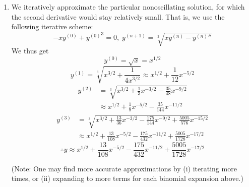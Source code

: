 \begin{enumerate}[wide, labelindent=0pt, label= (\alph*)]
\item
We iteratively approximate the particular nonoscillating solution, for which the second derivative would stay relatively small.
That is, we use the following iterative scheme:
\[
	-xy^{(0)} + {y^{(0)}}^3 = 0,\;
	y^{(n + 1)} = \sqrt[3]{xy^{(n)} - {y^{(n)}}''}
\]
We thus get
\[
	y^{(0)} = \sqrt{x} = x^{1/2}
\]
\[
	y^{(1)}
	= \sqrt[3]{x^{3/2} + \frac{1}{4x^{3/2}}}
	\approx x^{1/2} + \frac{1}{12} x^{-5/2}
\]
\begin{align*}
	y^{(2)}
	&= \sqrt[3]{x^{3/2} + \frac{1}{3}x^{-3/2} - \frac{35}{48}x^{-9/2}} \\
	&\approx x^{1/2} + \frac{1}{9}x^{-5/2} - \frac{35}{144}x^{-11/2}
\end{align*}
\begin{align*}
	y^{(3)}
	&= \sqrt[3]{x^{3/2} + \frac{13}{36}x^{-3/2} - \frac{175}{144}x^{-9/2} + \frac{5005}{576}x^{-15/2}} \\
	&\approx x^{1/2} + \frac{13}{108}x^{-5/2} - \frac{175}{432}x^{-11/2} + \frac{5005}{1728}x^{-17/2}
\end{align*}
\[
	\therefore y \approx x^{1/2} + \frac{13}{108}x^{-5/2} - \frac{175}{432}x^{-11/2} + \frac{5005}{1728}x^{-17/2}
\]

(Note: One may find more accurate approximations by (i) iterating more times, or (ii) expanding to more terms for each binomial expansion above.)

\end{enumerate}
